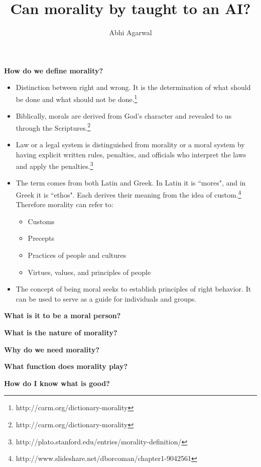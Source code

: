 \documentclass[11pt, oneside]{article}   	%
\title{Can morality by taught to an AI?}
\author{Abhi Agarwal}
\date{}							%
\begin{document}
\maketitle

\par \textbf{How do we define morality?}
\begin{itemize}
	\item Distinction between right and wrong. It is the determination of what should be done and what should not be done.\footnote{http://carm.org/dictionary-morality}
	\item Biblically, morals are derived from God's character and revealed to us through the Scriptures.\footnote{http://carm.org/dictionary-morality}
	\item Law or a legal system is distinguished from morality or a moral system by having explicit written rules, penalties, and officials who interpret the laws and apply the penalties.\footnote{http://plato.stanford.edu/entries/morality-definition/}
	\item The term comes from both Latin and Greek. In Latin it is ``mores", and in Greek it is ``ethos". Each derives their meaning from the idea of custom.\footnote{http://www.slideshare.net/dborcoman/chapter1-9042561} Therefore morality can refer to:
	\begin{itemize}
		\item Customs
		\item Precepts
		\item Practices of people and cultures
		\item Virtues, values, and principles of people
	\end{itemize}
	\item The concept of being moral seeks to establish principles of right behavior. It can be used to serve as a guide for individuals and groups. 
\end{itemize}

\par \textbf{What is it to be a moral person?}

\par \textbf{What is the nature of morality?}

\par \textbf{Why do we need morality?}

\par \textbf{What function does morality play?}

\par \textbf{How do I know what is good?}
\end{document}
